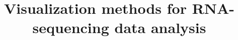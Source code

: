\documentclass[useAMS,referee]{biom}
\title[Visualization methods for RNA-sequencing data analysis]{Visualization methods for RNA-sequencing data analysis}
\begin{document}





\label{firstpage}


%
\end{document}
